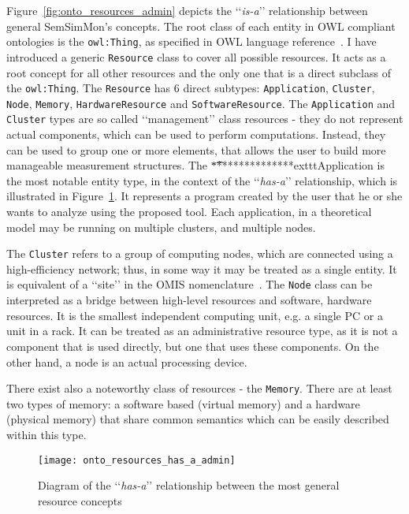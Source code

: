 Figure~\ref{fig:onto_resources_admin} depicts the \lq\lq{}\emph{is-a}\rq\rq{} relationship between general SemSimMon\rq{}s concepts. The root class of each entity in OWL compliant ontologies is the \texttt{owl:Thing}, as specified in OWL language reference~\cite{owlRef:2009}. I have introduced a generic \texttt{Resource} class to cover all possible resources. It acts as a root concept for all other resources and the only one that is a direct subclass of the \texttt{owl:Thing}. The \texttt{Resource} has 6 direct subtypes: \texttt{Application}, \texttt{Cluster}, \texttt{Node}, \texttt{Memory}, \texttt{HardwareResource} and \texttt{SoftwareResource}. The \texttt{Application} and \texttt{Cluster} types are so called \lq\lq{}management\rq\rq{} class resources - they do not represent actual components, which can be used to perform computations. Instead, they can be used to group one or more elements, that allows the user to build more manageable measurement structures. The \t*                     ***************exttt{Application} is the most notable entity type, in the context of the \lq\lq{}\emph{has-a}\rq\rq{} relationship, which is illustrated in Figure~\ref{fig:onto_resources_has_a_admin}. It represents a program created by the user that he or she wants to analyze using the proposed tool. Each application, in a theoretical model may be running on multiple clusters, and multiple nodes.

The \texttt{Cluster} refers to a group of computing nodes, which are connected using a high-efficiency network; thus, in some way it may be treated as a single entity. It is equivalent of a \lq\lq{}site\rq\rq{} in the OMIS nomenclature~\cite{tl9702e}. The \texttt{Node} class can be interpreted as a bridge between high-level resources and software, hardware resources. It is the smallest independent computing unit, e.g. a single PC or a unit in a rack. It can be treated as an administrative resource type, as it is not a component that is used directly, but one that uses these components. On the other hand, a node is an actual processing device.

There exist also a noteworthy class of resources - the \texttt{Memory}. There are at least two types of memory: a software based (virtual memory) and a hardware (physical memory) that share common semantics which can be easily described within this type.

\begin{figure}[ht]
\centering
\texttt{[image: onto\_resources\_has\_a\_admin]}
\caption{Diagram of the \lq\lq{}\emph{has-a}\rq\rq{} relationship between the most general resource concepts}
\label{fig:onto_resources_has_a_admin}
\end{figure}

